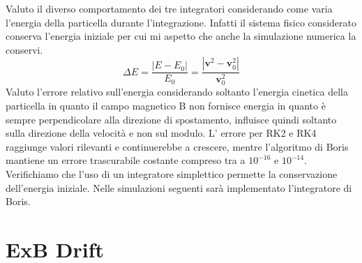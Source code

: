 \documentclass[11pt]{article}
\begin{document}
Valuto il diverso comportamento dei tre integratori considerando come varia l'energia della particella durante l'integrazione. 
Infatti il sistema fisico considerato conserva l'energia iniziale per cui mi aspetto che anche la simulazione numerica la conservi. \\ 
\begin{equation}\Delta E=\frac{|E-E_0|}{E_0} = \frac{|\mathbf{v}^2 - \mathbf{v}_0^2|}{\mathbf{v}_0^2}\end{equation}
Valuto l'errore relativo sull'energia considerando soltanto l'energia cinetica della particella in quanto il campo magnetico B non fornisce energia in quanto è sempre perpendicolare alla direzione di spostamento, influisce quindi soltanto sulla direzione della velocit\`a e non sul modulo.
L' errore per RK2 e RK4 raggiunge valori rilevanti e continuerebbe a crescere, mentre l'algoritmo di Boris mantiene un errore trascurabile costante compreso tra a $10^{-16}$ e $10^{-14}$. Verifichiamo  che l'uso di un integratore simplettico permette la conservazione dell'energia iniziale.
Nelle simulazioni seguenti sar\`a implementato l'integratore di Boris.


\section{ExB Drift}
\end{document}
